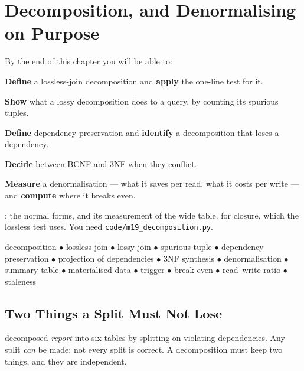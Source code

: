 \chapter{Decomposition, and Denormalising on Purpose}\label{ch:decomposition}

\begin{outcomes}
By the end of this chapter you will be able to:
\begin{tight}
  \item \textbf{Define} a lossless-join decomposition and \textbf{apply} the
        one-line test for it.
  \item \textbf{Show} what a lossy decomposition does to a query, by counting
        its spurious tuples.
  \item \textbf{Define} dependency preservation and \textbf{identify} a
        decomposition that loses a dependency.
  \item \textbf{Decide} between BCNF and 3NF when they conflict.
  \item \textbf{Measure} a denormalisation --- what it saves per read, what it
        costs per write --- and \textbf{compute} where it breaks even.
\end{tight}
\end{outcomes}

\begin{prereq}
: the normal forms, and its measurement of the wide table.
 for closure, which the lossless test uses. You need
\texttt{code/m19\_decomposition.py}.
\end{prereq}

\begin{keyterms}
decomposition $\bullet$ lossless join $\bullet$ lossy join $\bullet$ spurious
tuple $\bullet$ dependency preservation $\bullet$ projection of dependencies
$\bullet$ 3NF synthesis $\bullet$ denormalisation $\bullet$ summary table
$\bullet$ materialised data $\bullet$ trigger $\bullet$ break-even $\bullet$
read--write ratio $\bullet$ staleness
\end{keyterms}

\section{Two Things a Split Must Not Lose}

 decomposed \textit{report} into six tables by splitting on
violating dependencies. Any split \emph{can} be made; not every split is
correct. A decomposition must keep two things, and they are independent.

